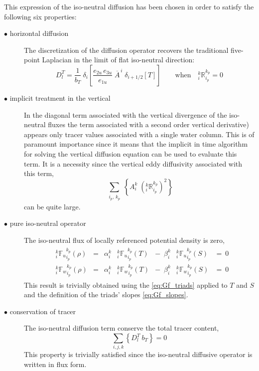\documentclass[../main/NEMO_manual]{subfiles}
\begin{document}
This expression of the iso-neutral diffusion has been chosen in order to satisfy the following six properties:
\begin{description}
\item[$\bullet$ horizontal diffusion]
  The discretization of the diffusion operator recovers the traditional five-point Laplacian in
  the limit of flat iso-neutral direction:
  \[
    D_l^T = \frac{1}{b_T}  \ \delta_{i}
    \left[ \frac{e_{2u}\,e_{3u}}{e_{1u}} \; \overline{A}^{\,i} \; \delta_{i+1/2}[T] \right]
    \qquad  \text{when} \quad
    { _i^k \mathbb{R}_{i_p}^{k_p} }=0
  \]

\item[$\bullet$ implicit treatment in the vertical]
  In the diagonal term associated with the vertical divergence of the iso-neutral fluxes
  \ie the term associated with a second order vertical derivative)
  appears only tracer values associated with a single water column.
  This is of paramount importance since it means that
  the implicit in time algorithm for solving the vertical diffusion equation can be used to evaluate this term.
  It is a necessity since the vertical eddy diffusivity associated with this term,
  \[
	 \sum_{\substack{i_p, \,k_p}} \left\{
		A_i^k \; \left(_i^k \mathbb{R}_{i_p}^{k_p}\right)^2
    \right\}
  \]
  can be quite large.

\item[$\bullet$ pure iso-neutral operator]
  The iso-neutral flux of locally referenced potential density is zero, \ie
  \begin{align*}
    \begin{matrix}
      &{_i^k {\mathbb{F}_u}_{i_p}^{k_p} (\rho)}
      &=    &\alpha_i^k   &{_i^k {\mathbb{F}_u}_{i_p}^{k_p} } (T)
      &- \ \;  \beta _i^k    &{_i^k {\mathbb{F}_u}_{i_p}^{k_p} } (S) & = \ 0   \\
      &{_i^k {\mathbb{F}_w}_{i_p}^{k_p} (\rho)}
      &=    &\alpha_i^k   &{_i^k {\mathbb{F}_w}_{i_p}^{k_p} } (T)
      &- \  \; \beta _i^k    &{_i^k {\mathbb{F}_w}_{i_p}^{k_p} } (S)  &= \ 0
    \end{matrix}
  \end{align*}
  This result is trivially obtained using the \autoref{eq:Gf_triads} applied to $T$ and $S$ and
  the definition of the triads' slopes \autoref{eq:Gf_slopes}.

\item[$\bullet$ conservation of tracer]
  The iso-neutral diffusion term conserve the total tracer content, \ie
  \[
    \sum_{i,j,k} \left\{ D_l^T \ b_T \right\} = 0
  \]
This property is trivially satisfied since the iso-neutral diffusive operator is written in flux form.


\end{description}
\end{document}
